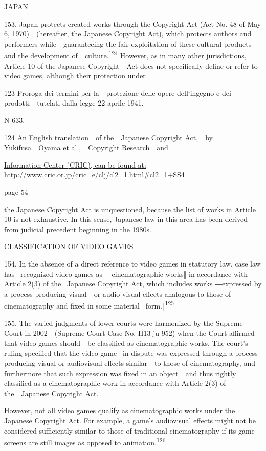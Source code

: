 \documentclass[
]{article}
\begin{document}
{JAPAN}

{153. }{Japan protects created works through the }{Copyright Act }{(Act
No. 48 of May 6, 1970)~~(hereafter, the Japanese }{Copyright Act}{),
which protects authors and performers while~~guaranteeing the fair
exploitation of these cultural products and the development
of~~culture.}\textsuperscript{{124 }}{However, as in many other
jurisdictions, Article 10 of the Japanese }{Copyright~~Act }{does not
specifically define or refer to video games, although their protection
under}

{123 }{Proroga dei termini per la~~protezione delle opere dell`ingegno e
dei prodotti~~tutelati dalla legge }{22 aprile 1941.}

{N 633.}

{124 }{An English translation~~of the~~Japanese }{Copyright Act}{,~~by
Yukifusa~~Oyama }{et al.}{,~~Copyright Research~~and}

\href{http://www.cric.or.jp/cric_e/clj/cl2_1.html\#cl2_1+SS4}{{Information
Center (CRIC), can be found at:
http://www.cric.or.jp/cric\_e/clj/cl2\_1.html\#cl2\_1+SS4}}

{page 54}

{the Japanese }{Copyright Act }{is unquestioned, because the list of
works in Article 10 is not exhaustive. In this sense, Japanese law in
this area has been derived from judicial precedent beginning in the
1980s.}

{CLASSIFICATION OF VIDEO GAMES}

{154. }{In the absence of a direct reference to video games in statutory
law, case law has }{~recognized video games as ―cinematographic works‖
in accordance with Article 2(3) of the }{~Japanese }{Copyright Act}{,
which includes works ―}{expressed by a process producing visual~~or
audio-visual effects analogous to those of cinematography and fixed in
some material }{~form.‖}\textsuperscript{{125}}

{155. }{The varied judgments of lower courts were harmonized by the
Supreme Court in 2002~~(Supreme Court Case No. H13-ju-952) when the
Court affirmed that video games should~~be classified as cinematographic
works. }{The court's ruling specified that the video game }{~in dispute
was expressed through a process producing visual or audiovisual effects
similar~~to those of cinematography, and furthermore that such
expression was fixed in an object~~and thus rightly classified as a
cinematographic work in accordance with Article 2(3) of the~~Japanese
}{Copyright Act}{.}

{However, not all video games qualify as cinematographic works under the
Japanese }{Copyright Act}{. }{For example, a game's audiovisual effects
might not be cons}{idered sufficiently similar to those of traditional
cinematography if its game screens are still images as opposed to
animation.}\textsuperscript{{126}}
\end{document}

